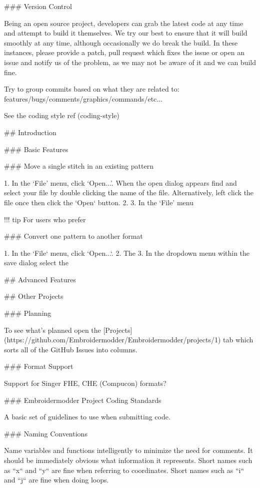 ### Version Control

Being an open source project, developers can grab the latest code at any time
and attempt to build it themselves. We try our best to ensure that it will build smoothly
at any time, although occasionally we do break the build. In these instances,
please provide a patch, pull request which fixes the issue or open an issue and
notify us of the problem, as we may not be aware of it and we can build fine.

Try to group commits based on what they are related to: features/bugs/comments/graphics/commands/etc...

See the coding style ref (coding-style)

## Introduction

### Basic Features

### Move a single stitch in an existing pattern

1. In the `File' menu, click `Open...'. When the open dialog appears find and select your file by double clicking the name of the file. Alternatively, left click the file once then click the `Open` button.
2.
3. In the `File' menu

!!! tip
    For users who prefer

### Convert one pattern to another format

1. In the `File` menu, click `Open...`.
2. The 
3. In the dropdown menu within the save dialog select the 

## Advanced Features

## Other Projects

### Planning

To see what's planned open the [Projects](https://github.com/Embroidermodder/Embroidermodder/projects/1) tab which sorts all of the GitHub Issues into columns.

### Format Support

Support for Singer FHE, CHE (Compucon) formats?

### Embroidermodder Project Coding Standards

A basic set of guidelines to use when submitting code.

### Naming Conventions

Name variables and functions intelligently to minimize the need for comments.
It should be immediately obvious what information it represents.
Short names such as ``x`` and ``y`` are fine when referring to coordinates.
Short names such as ``i`` and ``j`` are fine when doing loops.

